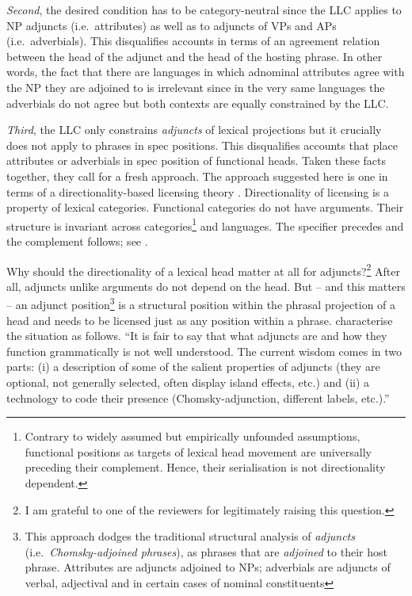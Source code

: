 \documentclass[output=paper
  ,nobabel
  ,uniformtopskip %
]{langscibook}
\begin{document}
\emph{Second}, the desired condition has to be category-neutral since the LLC applies to NP adjuncts (i.e.\ attributes) as well as to adjuncts of VPs and APs (i.e.\ adverbials). This disqualifies accounts in terms of an agreement relation between the head of the adjunct and the head of the hosting phrase. In other words, the fact that there are languages in which adnominal attributes agree with the NP they are adjoined to is irrelevant since in the very same languages the adverbials do not agree but both contexts are equally constrained by the LLC.

\emph{Third}, the LLC only constrains \emph{adjuncts} of lexical projections but it crucially does not apply to phrases in spec positions. This disqualifies accounts that place attributes or adverbials in spec position of functional heads. Taken these facts together, they call for a fresh approach. The approach suggested here is one in terms of a directionality-based licensing theory \citep{Haider2013,Haider2015}. Directionality of licensing is a property of lexical categories. Functional categories do not have arguments. Their structure is invariant across categories\footnote{Contrary to widely assumed but empirically unfounded assumptions, functional positions as targets of lexical head movement are universally preceding their complement. Hence, their serialisation is not  directionality dependent.}  and languages. The specifier precedes and the complement follows; see \citet{Haider2013,Haider2015}.

Why should the directionality of a lexical head matter at all for adjuncts?\footnote{I am grateful to one of the reviewers for legitimately raising this question.}  After all, adjuncts unlike arguments do not depend on the head. But – and this matters – an adjunct position\footnote{This approach dodges the traditional structural analysis of \emph{adjuncts} (i.e.\ \emph{Chomsky-adjoined phrases}), as phrases that are \emph{adjoined} to their host phrase. Attributes are adjuncts adjoined to NPs; adverbials are adjuncts of verbal, adjectival and in certain cases of nominal constituents}  is a structural position within the phrasal projection of a head and needs to be licensed just as any position within a phrase. \citet*[57]{HornsteinNunes2008} characterise the situation as follows. ``It is fair to say that what adjuncts are and how they function grammatically is not well understood. The current wisdom comes in two parts: (i) a description of some of the salient properties of adjuncts (they are optional, not generally selected, often display island effects, etc.) and (ii) a technology to code their presence (Chomsky-adjunction, different labels, etc.).''
\end{document}
